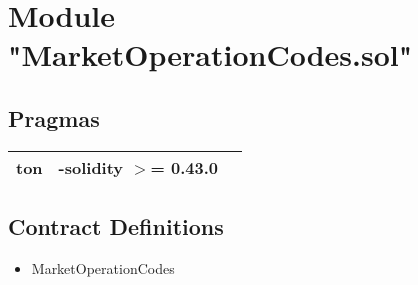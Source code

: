 
\section{Module "MarketOperationCodes.sol"}


\subsection{Pragmas}


\noindent\begin{tabular}{|l|l|p{5cm}|}\hline
ton & -solidity $>$= 0.43.0 &\\\hline
\end{tabular}


\subsection{Contract Definitions}

\begin{itemize}
\item MarketOperationCodes
\end{itemize}
